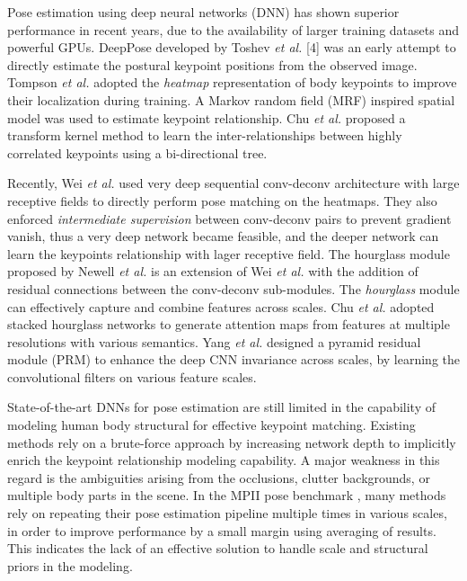 \documentclass[runningheads]{llncs}
\begin{document}
Pose estimation using deep neural networks (DNN) \cite{Toshev:DeepPose:CVPR2014,pfister2015flowing,Tompson:Unified:Pose:NIPS2014,Chu:Structured:Learning:Pose:CVPR2016,wei2016convolutional} has shown superior performance in recent years, due to the availability of larger training datasets and powerful GPUs.  DeepPose developed by Toshev {\em et al.} [4] was an early attempt to directly estimate the postural keypoint positions from the observed image. Tompson {\em et al.} \cite{Tompson:Unified:Pose:NIPS2014} adopted the {\em heatmap} representation of body keypoints to improve their localization during training. 
A Markov random field (MRF) inspired spatial model was used to estimate keypoint relationship. 
Chu {\em et al.} \cite{chu2016structured} proposed a transform kernel method to learn the inter-relationships between highly correlated keypoints using a bi-directional tree. 

Recently, Wei {\em et al.} \cite{wei2016convolutional} used very deep sequential conv-deconv architecture with large receptive fields to directly perform pose matching on the heatmaps. They also enforced {\em intermediate supervision} between conv-deconv pairs to prevent gradient vanish, thus a very deep network became feasible, and the deeper network can learn the keypoints relationship with lager receptive field. 
The hourglass module proposed by Newell {\em et al.} \cite{newell2016stacked} is an extension of Wei {\em et al.} with the addition of residual connections between the conv-deconv sub-modules. The {\em hourglass} module can effectively capture and combine features across scales.
Chu {\em et al.} \cite{chu2017multi} adopted stacked hourglass networks to generate attention maps from features at multiple resolutions with various semantics. Yang {\em et al.} \cite{yang2017learning} designed a pyramid residual module (PRM) to enhance the deep CNN invariance across scales, by learning the convolutional filters on various feature scales.

State-of-the-art DNNs for pose estimation are still limited in the capability of modeling human body structural for effective keypoint matching.
Existing methods rely on a brute-force approach by increasing network depth to implicitly enrich the keypoint relationship modeling capability. A major weakness in this regard is the ambiguities arising from the occlusions, clutter backgrounds, or multiple body parts in the scene. In the MPII pose benchmark \cite{andriluka14cvpr}, many methods \cite{Chu:Structured:Learning:Pose:CVPR2016,wei2016convolutional,newell2016stacked,chu2017multi,yang2017learning} rely on repeating their pose estimation pipeline multiple times in various scales, in order to improve performance by a small margin using averaging of results. This indicates the lack of an effective solution to handle scale and structural priors in the modeling.
\end{document}
